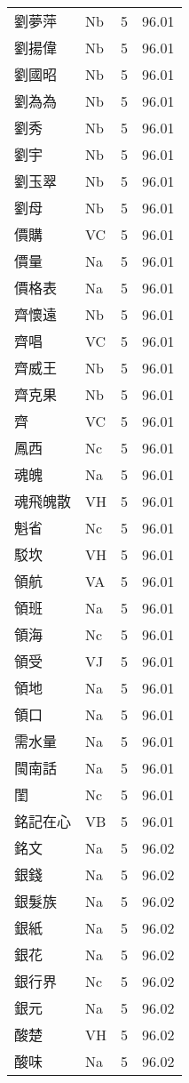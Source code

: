 \documentclass[twocolumn]{book}
\begin{document}
\begin{supertabular}{llrr}
劉夢萍 & Nb & 5 &  96.01\\
劉揚偉 & Nb & 5 &  96.01\\
劉國昭 & Nb & 5 &  96.01\\
劉為為 & Nb & 5 &  96.01\\
劉秀 & Nb & 5 &  96.01\\
劉宇 & Nb & 5 &  96.01\\
劉玉翠 & Nb & 5 &  96.01\\
劉母 & Nb & 5 &  96.01\\
價購 & VC & 5 &  96.01\\
價量 & Na & 5 &  96.01\\
價格表 & Na & 5 &  96.01\\
齊懷遠 & Nb & 5 &  96.01\\
齊唱 & VC & 5 &  96.01\\
齊威王 & Nb & 5 &  96.01\\
齊克果 & Nb & 5 &  96.01\\
齊 & VC & 5 &  96.01\\
鳳西 & Nc & 5 &  96.01\\
魂魄 & Na & 5 &  96.01\\
魂飛魄散 & VH & 5 &  96.01\\
魁省 & Nc & 5 &  96.01\\
駁坎 & VH & 5 &  96.01\\
領航 & VA & 5 &  96.01\\
領班 & Na & 5 &  96.01\\
領海 & Nc & 5 &  96.01\\
領受 & VJ & 5 &  96.01\\
領地 & Na & 5 &  96.01\\
領口 & Na & 5 &  96.01\\
需水量 & Na & 5 &  96.01\\
閩南話 & Na & 5 &  96.01\\
閨 & Nc & 5 &  96.01\\
銘記在心 & VB & 5 &  96.01\\
銘文 & Na & 5 &  96.02\\
銀錢 & Na & 5 &  96.02\\
銀髮族 & Na & 5 &  96.02\\
銀紙 & Na & 5 &  96.02\\
銀花 & Na & 5 &  96.02\\
銀行界 & Nc & 5 &  96.02\\
銀元 & Na & 5 &  96.02\\
酸楚 & VH & 5 &  96.02\\
酸味 & Na & 5 &  96.02\\

\end{supertabular}
\end{document}
